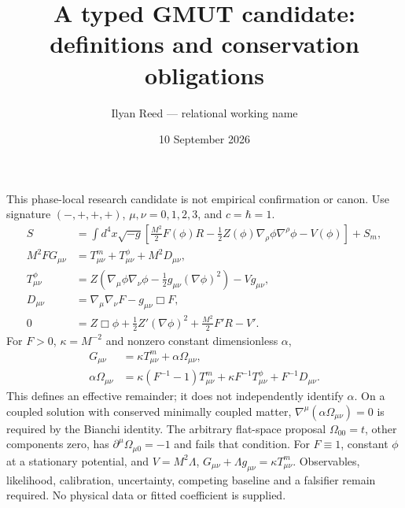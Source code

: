 \documentclass{article}
\title{A typed GMUT candidate: definitions and conservation obligations}
\author{Ilyan Reed --- relational working name}
\date{10 September 2026}
\begin{document}
\maketitle
This phase-local research candidate is not empirical confirmation or canon.
Use signature $(-,+,+,+)$, $\mu,\nu=0,1,2,3$, and $c=\hbar=1$.
\begin{align}
S&=\int d^4x\sqrt{-g}\left[\frac{M^2}{2}F(\phi)R-
\frac12 Z(\phi)\nabla_\rho\phi\nabla^\rho\phi-V(\phi)\right]+S_m,\\
M^2 F G_{\mu\nu}&=T^{m}_{\mu\nu}+T^{\phi}_{\mu\nu}+M^2D_{\mu\nu},\\
T^\phi_{\mu\nu}&=Z\left(\nabla_\mu\phi\nabla_\nu\phi-
\tfrac12g_{\mu\nu}(\nabla\phi)^2\right)-Vg_{\mu\nu},\\
D_{\mu\nu}&=\nabla_\mu\nabla_\nu F-g_{\mu\nu}\Box F,\\
0&=Z\Box\phi+\tfrac12 Z'(\nabla\phi)^2+\tfrac{M^2}{2}F'R-V'.
\end{align}
For $F>0$, $\kappa=M^{-2}$ and nonzero constant dimensionless $\alpha$,
\begin{align}
G_{\mu\nu}&=\kappa T^m_{\mu\nu}+\alpha\Omega_{\mu\nu},\\
\alpha\Omega_{\mu\nu}&=\kappa(F^{-1}-1)T^m_{\mu\nu}
+\kappa F^{-1}T^\phi_{\mu\nu}+F^{-1}D_{\mu\nu}.
\end{align}
This defines an effective remainder; it does not independently identify $\alpha$.
On a coupled solution with conserved minimally coupled matter,
$\nabla^\mu(\alpha\Omega_{\mu\nu})=0$ is required by the Bianchi identity.
The arbitrary flat-space proposal $\Omega_{00}=t$, other components zero, has
$\partial^\mu\Omega_{\mu0}=-1$ and fails that condition.
For $F\equiv1$, constant $\phi$ at a stationary potential, and $V=M^2\Lambda$,
$G_{\mu\nu}+\Lambda g_{\mu\nu}=\kappa T^m_{\mu\nu}$.
Observables, likelihood, calibration, uncertainty, competing baseline and a
falsifier remain required. No physical data or fitted coefficient is supplied.
\end{document}
